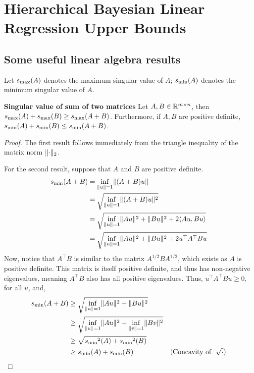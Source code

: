
\section{Hierarchical Bayesian Linear Regression Upper Bounds}
\subsection{Some useful linear algebra results}
Let ${s_{\max}}(A)$ denotes the maximum singular value of $A$; ${s_{\min}}(A)$ denotes the minimum singular value of $A$.

\begin{lemma}\textbf{Singular value of sum of two matrices}\label{lemma:sigma_sum_lemma}
Let $A, B \in \mathbb{R}^{m \times n}$, then
${s_{\max}}(A) + {s_{\max}}(B) \ge {s_{\max}}(A+B)$. Furthermore, if $A, B$ are positive definite, 
${s_{\min}}(A) + {s_{\min}}(B) \le {s_{\min}}(A+B)$.
\end{lemma}
\begin{proof}
The first result follows immediately from the triangle inequality of the matrix norm $\lVert \cdot \rVert_2$.

For the second result, suppose that $A$ and $B$ are positive definite.
\begin{align}
{s_{\min}}(A + B) &= \inf_{\lVert u \rVert=1} \lVert (A+B)u \rVert \\
&= \sqrt{\inf_{\lVert u \rVert=1} \lVert (A+B)u \rVert^2} \\
&= \sqrt{\inf_{\lVert u \rVert=1} \lVert Au \rVert^2 + \lVert Bu \rVert^2 + 2\langle Au, Bu \rangle } \\
&= \sqrt{\inf_{\lVert u \rVert=1} \lVert Au \rVert^2 + \lVert Bu \rVert^2 + 2u^\top A^\top Bu } \\
\end{align}
Now, notice that $A^\top B$ is similar to the matrix $A^{1/2}BA^{1/2}$, which exists as $A$ is positive definite. This matrix is itself positive definite, and thus has non-negative eigenvalues, meaning $A^\top B$ also has all positive eigenvalues. Thus, $u^\top A^\top Bu \ge 0$, for all $u$, and,
\begin{align}
\smin(A + B) & \ge \sqrt{\inf_{\norm{u}=1} \norm{Au}^2 + \norm{Bu}^2} & \\
& \ge \sqrt{\inf_{\norm{u}=1} \norm{Au}^2 + \inf_{\norm{v}=1} \norm{Bv}^2} \\
& \ge \sqrt{\smin^2(A) + \smin^2(B)} \\
& \ge \smin(A) + \smin(B) & (\text{Concavity of} \ \ \sqrt{\cdot})
\end{align}
\end{proof}

